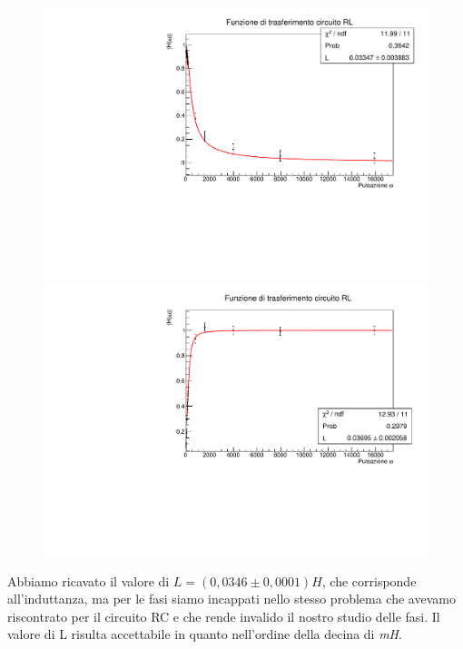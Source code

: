 \begin{figure}[H]
    \centering
    \includegraphics[scale=.4]{Immagini/trasferimento RL.pdf}
    \\
    \includegraphics[scale=.4]{Immagini/trasferimento RL 2.pdf}
    \caption{}
\end{figure}

Abbiamo ricavato il valore di $\textit{L}=(0,0346 \pm 0,0001)H$, che corrisponde all’induttanza, ma per le fasi siamo incappati nello stesso problema che avevamo riscontrato per il circuito RC e che rende invalido  il nostro studio delle fasi. 
Il valore di L risulta accettabile in quanto nell’ordine della decina di \textit{mH}.
